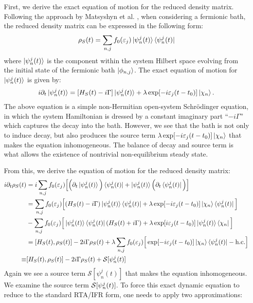 \documentclass[twocolumn, prx, reprint, amsfonts, amsmath, amssymb, longbibliography, floatfix, aps]{revtex4-2}
\begin{document}
First, we derive the exact equation of motion for the reduced density matrix. Following the approach by Matsyshyn et al. \cite{matsyshyn2023fermi}, when considering a fermionic bath, the reduced density matrix can be expressed in the following form:
\begin{equation}
    \rho_S(t) = \sum_{n, j} f_0(\varepsilon_{j}) \ket{\psi^{j}_n (t)}\bra{\psi^{j}_n (t)}
\end{equation}
where $\ket{\psi^{j}_n (t)}$ is the component within the system Hilbert space evolving from the initial state of the fermionic bath $\ket{\phi_{n, j}}$. The exact equation of motion for $\ket{\psi^{j}_n (t)}$ is given by:
\begin{equation}
    i\partial_t \ket{\psi^{j}_n (t)} = [H_S(t) - i\Gamma]\ket{\psi^{j}_n (t)} + \lambda \exp [-i\varepsilon_j (t-t_0)] \ket{\chi_n} .
\end{equation}
The above equation is a simple non-Hermitian open-system Schrödinger equation, in which the system Hamiltonian is dressed by a constant imaginary part ``$-i \Gamma$'' which captures the decay into the bath. However, we see that the bath is not only to induce decay, but also produces the source term $\lambda \exp [-i\varepsilon_j (t-t_0)] \ket{\chi_n}$ that makes the equation inhomogeneous. The balance of decay and source term is what allows the existence of nontrivial non-equilibrium steady state.

From this, we derive the equation of motion for the reduced density matrix:
\begin{equation}
    \begin{aligned}
        i\partial_t \rho_S(t) &= i\sum_{n, j} f_0(\varepsilon_{j})\Big[\Big(\partial_t \ket{\psi^{j}_n (t)}\Big)\bra{\psi^{j}_n (t)} + \ket{\psi^{j}_n (t)}\Big(\partial_t \bra{\psi^{j}_n (t)}\Big)\Big] \\
        &= \sum_{n, j} f_0(\varepsilon_{j}) \Big[(H_S(t) - i\Gamma)\ket{\psi^{j}_n (t)}\bra{\psi^{j}_n (t)} + \lambda \exp [-i\varepsilon_j (t-t_0)] \ket{\chi_n}\bra{\psi^{j}_n (t)} \Big] \\
        &-\sum_{n, j} f_0(\varepsilon_{j}) \Big[\ket{\psi^{j}_n (t)}\bra{\psi^{j}_n (t)}(H_S(t) + i\Gamma) + \lambda \exp [i\varepsilon_j (t-t_0)] \ket{\psi^{j}_n (t)}\bra{\chi_n} \Big] \\
        &= [H_S(t), \rho_S(t)] - 2i\Gamma \rho_S(t) + \lambda \sum_{n, j}  f_0(\varepsilon_{j}) \Big[\exp [-i\varepsilon_j (t-t_0)] \ket{\chi_n}\bra{\psi^{j}_n (t)} - \text{h.c.}\Big] \\
        \equiv & [H_S(t), \rho_S(t)] - 2i\Gamma \rho_S(t) + {\cal S}[\psi^{j}_n (t)]
    \end{aligned}
\end{equation}
Again we see a source term $\mathcal{S}[\psi^{j}_n (t)]$ that makes the equation inhomogeneous. We examine the source term ${\cal S}[\psi^{j}_n (t)]$. To force this exact dynamic equation to reduce to the standard RTA/IFR form, one needs to apply two approximations:
\end{document}
